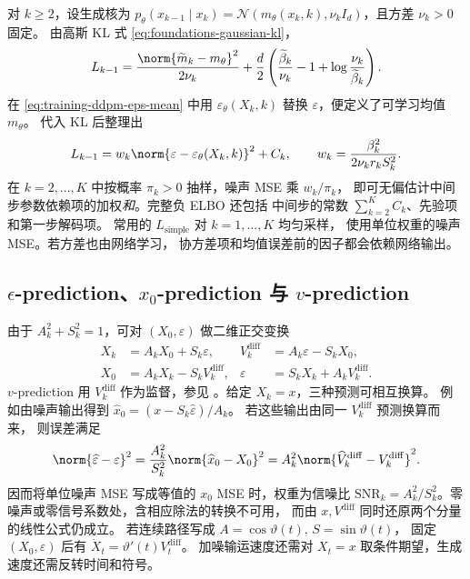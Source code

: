 对 \(k\ge 2\)，设生成核为 \(p_\theta(x_{k-1}\mid x_k)
=\mathcal N(m_\theta(x_k,k),\nu_k I_d)\)，且方差 \(\nu_k>0\) 固定。
由高斯 KL 式 \eqref{eq:foundations-gaussian-kl}，
\[
  L_{k-1}=\frac{\norm{\widetilde m_k-m_\theta}^2}{2\nu_k}
    +\frac d2\left(\frac{\widetilde\beta_k}{\nu_k}-1+
                       \log\frac{\nu_k}{\widetilde\beta_k}\right).
\]
在 \eqref{eq:training-ddpm-eps-mean} 中用 \(\varepsilon_\theta(X_k,k)\)
替换 \(\varepsilon\)，便定义了可学习均值 \(m_\theta\)。
代入 KL 后整理出
\begin{equation}
  L_{k-1}=w_k\norm{\varepsilon-\varepsilon_\theta(X_k,k)}^2+C_k,\qquad
  w_k=\frac{\beta_k^2}{2\nu_k r_k S_k^2}.
  \label{eq:training-ddpm-weight}
\end{equation}
在 \(k=2,\ldots,K\) 中按概率 \(\pi_k>0\) 抽样，噪声 MSE 乘 \(w_k/\pi_k\)，
即可无偏估计中间步参数依赖项的加权\emph{和}。完整负 ELBO 还包括
中间步的常数 \(\sum_{k=2}^K C_k\)、先验项和第一步解码项。
常用的 \(L_{\mathrm{simple}}\) 对 \(k=1,\ldots,K\) 均匀采样，
使用单位权重的噪声 MSE。若方差也由网络学习，
协方差项和均值误差前的因子都会依赖网络输出。

\subsection{\texorpdfstring{\(\epsilon\)}{ε}-prediction、\texorpdfstring{\(x_0\)}{x\_0}-prediction 与 \texorpdfstring{\(v\)}{v}-prediction}

由于 \(A_k^2+S_k^2=1\)，可对 \((X_0,\varepsilon)\) 做二维正交变换
\begin{equation}
  \begin{aligned}
  X_k&=A_k X_0+S_k\varepsilon,&
  V_k^{\mathrm{diff}}&=A_k\varepsilon-S_k X_0,\\
  X_0&=A_k X_k-S_k V_k^{\mathrm{diff}},&
  \varepsilon&=S_k X_k+A_k V_k^{\mathrm{diff}} .
  \end{aligned}
  \label{eq:training-ddpm-vpred}
\end{equation}
\(v\)-prediction 用 \(V_k^{\mathrm{diff}}\) 作为监督，参见
\cite{salimans2022distill}。给定 \(X_k=x\)，三种预测可相互换算。
例如由噪声输出得到 \(\widehat x_0=(x-S_k\widehat\varepsilon)/A_k\)。
若这些输出由同一 \(V_k^{\mathrm{diff}}\) 预测换算而来，
则误差满足
\begin{equation}
  \norm{\widehat\varepsilon-\varepsilon}^2
  =\frac{A_k^2}{S_k^2}\norm{\widehat x_0-X_0}^2
  =A_k^2\norm{\widehat V_k^{\mathrm{diff}}-V_k^{\mathrm{diff}}}^2.
  \label{eq:training-ddpm-parameterization}
\end{equation}
因而将单位噪声 MSE 写成等值的 \(x_0\) MSE 时，权重为信噪比
\(\mathrm{SNR}_k=A_k^2/S_k^2\)。零噪声或零信号系数处，含相应除法的转换不可用，
而由 \(x,V^{\mathrm{diff}}\) 同时还原两个分量的线性公式仍成立。
若连续路径写成 \(A=\cos\vartheta(t),\,S=\sin\vartheta(t)\)，
固定 \((X_0,\varepsilon)\) 后有 \(\dot X_t=\vartheta'(t)V_t^{\mathrm{diff}}\)。
加噪输运速度还需对 \(X_t=x\) 取条件期望，生成速度还需反转时间和符号。

